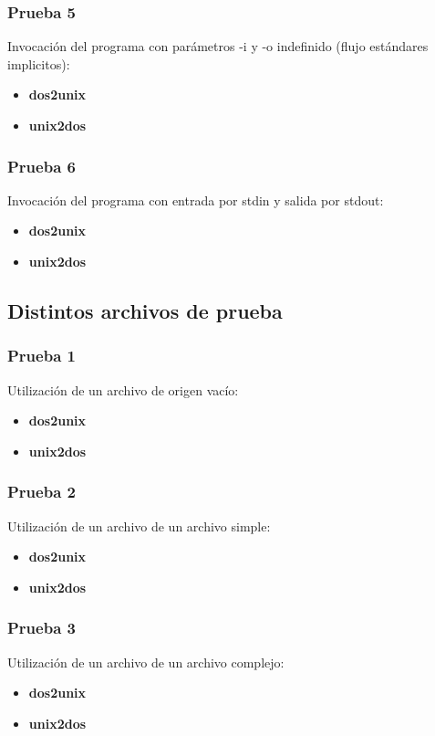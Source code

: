 \documentclass[a4paper,10pt]{article}
\begin{document}
    \subsubsection{Prueba 5}
    Invocaci\'on del programa con par\'ametros -i y -o indefinido (flujo est\'andares implicitos):
      \begin{itemize}
      \item \textbf{dos2unix}
      \item \textbf{unix2dos}
      \end{itemize}

    \subsubsection{Prueba 6}
    Invocaci\'on del programa con entrada por stdin y salida por stdout:
      \begin{itemize}
      \item \textbf{dos2unix}
      \item \textbf{unix2dos}
      \end{itemize}

  \subsection{Distintos archivos de prueba}
    \subsubsection{Prueba 1}
    Utilizaci\'on de un archivo de origen vac\'io:
      \begin{itemize}
      \item \textbf{dos2unix}
      \item \textbf{unix2dos}
      \end{itemize}

    \subsubsection{Prueba 2}
    Utilizaci\'on de un archivo de un archivo simple:
      \begin{itemize}
      \item \textbf{dos2unix}
      \item \textbf{unix2dos}
      \end{itemize}

    \subsubsection{Prueba 3}
    Utilizaci\'on de un archivo de un archivo complejo:
      \begin{itemize}
      \item \textbf{dos2unix}
      \item \textbf{unix2dos}
      \end{itemize}
\end{document}
